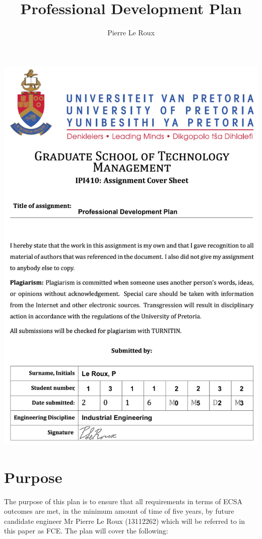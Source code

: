 \documentclass[11pt,a4paper]{article}
\title{Professional Development Plan}
\author{Pierre Le Roux}
\begin{document}
	\begin{titlepage}
		\includegraphics[width=\textwidth]{Extra/Front_Page.jpg}
	\end{titlepage}
	
	\pagebreak
	
	\setcounter{page}{1}
	
	\section{Purpose}
		The purpose of this plan is to ensure that all requirements in terms of ECSA outcomes are met, in the minimum amount of time of five years, by future candidate engineer Mr Pierre Le Roux (13112262) which will be referred to in this paper as FCE.
		The plan will cover the following:
		
\end{document}
